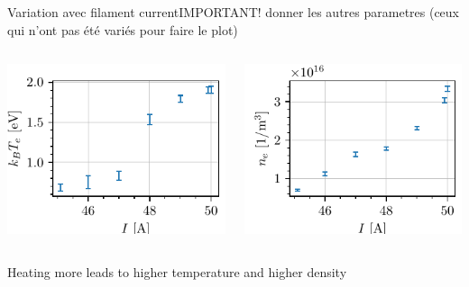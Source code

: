 \documentclass[10pt]{beamer}
\begin{document}
\begin{frame}{Variation avec filament current}{IMPORTANT! donner les autres parametres (ceux qui n'ont pas été variés pour faire le plot)}
    \begin{columns}
        \centering
        \includegraphics[scale=1]{../figures/temperatureeV_current.pdf}


        \centering
        \includegraphics[scale=1]{../figures/density_current.pdf}

    \end{columns}
    \vspace{0.5cm}
    Heating more leads to higher temperature and higher density
\end{frame}
\end{document}

